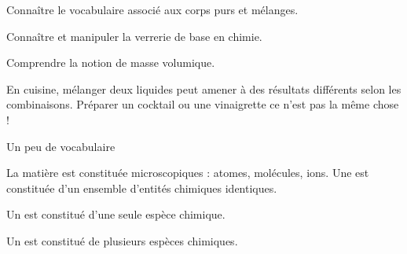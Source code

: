 \teteSndCorp

\vspace*{-12pt}


\begin{objectifs}
  \item Connaître le vocabulaire associé aux corps purs et mélanges.
  \item Connaître et manipuler la verrerie de base en chimie.
  \item Comprendre la notion de masse volumique.
\end{objectifs}

\begin{contexte}
  En cuisine, mélanger deux liquides peut amener à des résultats différents selon les combinaisons.
  Préparer un cocktail ou une vinaigrette ce n'est pas la même chose !
  
\end{contexte}


\begin{doc}{Un peu de vocabulaire}
  \label{doc:vocabulaire_melange}
  \vspace*{-24pt}
  \begin{encart}
    La matière est constituée  microscopiques : atomes, molécules, ions.
    Une  est constituée d’un ensemble d’entités chimiques
identiques.
  \end{encart}
    
  \begin{encart}
    \begin{listePoints}
      \item Un  est constitué d'une seule espèce chimique.
      \item Un  est constitué de plusieurs espèces chimiques.
    \end{listePoints}
  \end{encart}
\end{doc}

